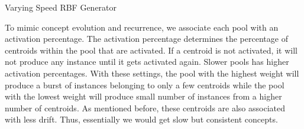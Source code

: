 \begin{algorithm}[htbp]
    \caption{Varying Speed RBF Generator}
    \label{alg:vsrbf}
    \DontPrintSemicolon
      
    
    
\end{algorithm}

To mimic concept evolution and recurrence, we associate each pool with an activation percentage. The activation percentage determines the percentage of centroids within the pool that are activated. If a centroid is not activated, it will not produce any instance until it gets activated again. Slower pools has higher activation percentages. With these settings, the pool with the highest weight will produce a burst of instances belonging to only a few centroids while the pool with the lowest weight will produce small number of instances from a higher number of centroids. As mentioned before, these centroids are also associated with less drift. Thus, essentially we would get slow but consistent concepts.


